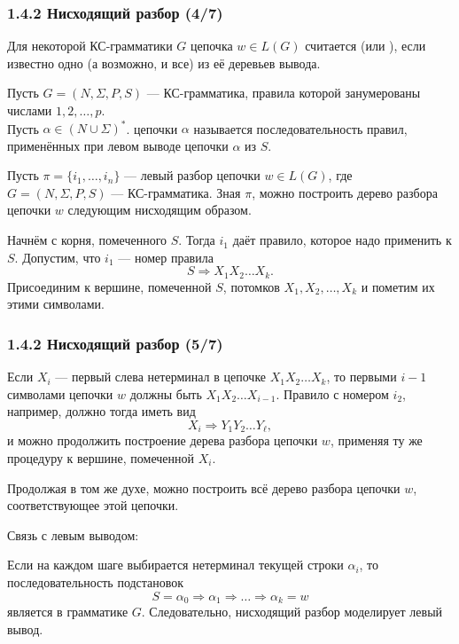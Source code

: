 \begin{frame}
\frametitle{1.4.2 Нисходящий разбор (4/7)}
Для некоторой КС-грамматики $G$ цепочка $w \in L(G)$ считается  (или ), если известно одно (а возможно, и все) из её деревьев вывода.

\begin{definition} 
    Пусть $G = (N, \Sigma, P, S)$ --- КС-грамматика, правила которой занумерованы числами $1, 2, \dots, p$. \\
    Пусть $\alpha \in (N \cup \Sigma)^*$.  цепочки $\alpha$ называется последовательность правил, применённых при левом выводе цепочки $\alpha$ из $S$.
\end{definition}

Пусть $\pi = \{i_1, \dots, i_n\}$ --- левый разбор цепочки $w \in L(G)$, где $G = (N, \Sigma, P, S)$ --- КС-грамматика. Зная $\pi$, можно построить дерево разбора цепочки $w$ следующим нисходящим образом.

Начнём с корня, помеченного $S$. Тогда $i_1$ даёт правило, которое надо применить к $S$. Допустим, что $i_1$ --- номер правила
\[
S \Rightarrow X_1 X_2 \dots X_k.
\]
Присоединим к вершине, помеченной $S$, потомков $X_1, X_2, \dots, X_k$ и пометим их этими символами.
\end{frame}

\begin{frame}
\frametitle{1.4.2 Нисходящий разбор (5/7)}
Если $X_i$ --- первый слева нетерминал в цепочке $X_1 X_2 \dots X_k$, то первыми $i-1$ символами цепочки $w$ должны быть $X_1 X_2 \dots X_{i-1}$. Правило с номером $i_2$, например, должно тогда иметь вид
\[
X_i \Rightarrow Y_1 Y_2 \dots Y_\ell,
\]
и можно продолжить построение дерева разбора цепочки $w$, применяя ту же процедуру к вершине, помеченной $X_i$.

Продолжая в том же духе, можно построить всё дерево разбора цепочки $w$, соответствующее  этой цепочки.

Связь с левым выводом:

Если на каждом шаге выбирается  нетерминал текущей строки $\alpha_i$, то последовательность подстановок
\[
S = \alpha_0 \Rightarrow \alpha_1 \Rightarrow \dots \Rightarrow \alpha_k = w
\]
является  в грамматике $G$. Следовательно, нисходящий разбор моделирует левый вывод.

\end{frame}

